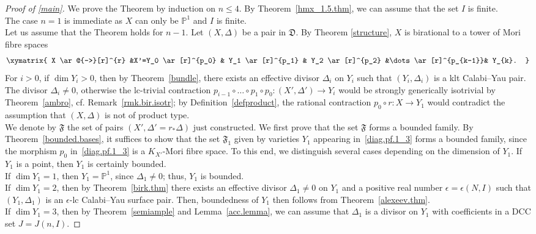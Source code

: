 \documentclass{amsart}[12pt,a4paper]
\theoremstyle{definition}
\begin{document}
\begin{proof}[Proof of \ref{main}]
We prove the Theorem by induction on $n \leq 4$.
By Theorem~\ref{hmx_1.5.thm}, we can assume that the set $I$ is finite.\\
The case $n=1$ is immediate as $X$ can only be $\mathbb{P}^1$ and $I$ is finite.
\\
Let us assume that the Theorem holds for $n-1$.
Let $(X, \Delta)$ be a pair in $\mathfrak{D}$.
By Theorem \ref{structure}, $X$ is birational to a tower of Mori fibre spaces
\begin{equation}
\label{diag.pf.1_3}
\xymatrix{
X \ar@{-->}[r]^{r} &X'=Y_0 \ar[r]^{p_0} & Y_1 \ar[r]^{p_1} & Y_2 \ar[r]^{p_2} &\dots \ar[r]^{p_{k-1}}& Y_{k}.
}
\end{equation}
For $i>0$, if $\dim Y_i>0$, then by Theorem~\ref{bundle}, there exists an effective divisor $\Delta_i$ on $Y_i$ such that $(Y_i, \Delta_i)$ is a klt Calabi--Yau pair.
The divisor $\Delta_i \neq 0$, otherwise the lc-trivial contraction $p_{i-1} \circ \dots \circ p_1\circ p_0 \colon (X', \Delta') \to Y_i$ would be strongly generically isotrivial by Theorem~\ref{ambro}, cf. Remark~\ref{rmk.bir.isotr};
by Definition~\ref{defproduct}, the rational contraction $p_0 \circ r \colon X \to Y_1$ would contradict the assumption that $(X, \Delta)$ is not of product type.
\\
We denote by $\mathfrak{F}$ the set of pairs $(X',\Delta'=r_\ast \Delta)$ just constructed.
We first prove that the set $\mathfrak{F}$ forms a bounded family.
By Theorem~\ref{bounded.bases}, it suffices to show that the set $\mathfrak{F}_1$ given by varieties $Y_1$ appearing in~\eqref{diag.pf.1_3} forms a bounded family, since the morphism $p_0$ in~\eqref{diag.pf.1_3} is a $K_{X'}$-Mori fibre space.
To this end, we distinguish several cases depending on the dimension of $Y_1$.
\newline
If $Y_1$ is a point, then $Y_1$ is certainly bounded.
\\
If $\dim Y_1 =1$, then $Y_1 = \mathbb{P}^1$, since $\Delta_1 \neq 0$; thus, $Y_1$ is bounded.
\\
If $\dim Y_1 =2$, then by Theorem~\ref{birk.thm} there exists an effective divisor $\Delta_1 \neq 0$ on $Y_1$ and a positive real number $\epsilon=\epsilon(N, I)$ such that $(Y_1, \Delta_1)$ is an $\epsilon$-lc Calabi--Yau surface pair.
Then, boundedness of $Y_1$ then follows from Theorem~\ref{alexeev.thm}.
\\
If $\dim Y_1=3$, then by Theorem~\ref{semiample} and Lemma~\ref{acc.lemma}, we can assume that $\Delta_1$ is a divisor on $Y_1$ with coefficients in a DCC set $J=J(n, I)$.

\end{proof}
\end{document}
